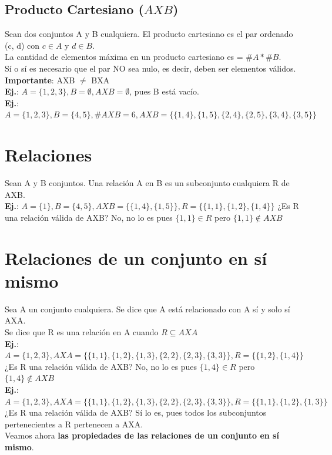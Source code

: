 \documentclass[10pt,a4paper]{article}
\begin{document}
\subsection*{Producto Cartesiano ($A X B$)}
Sean dos conjuntos A y B cualquiera. El producto cartesiano es el par ordenado (c, d) con $c \in A$ y $d \in B$. \\ 
La cantidad de elementos máxima en un producto cartesiano es = $\#A \ast \#B$. \\
Sí o sí es necesario que el par NO sea nulo, es decir, deben ser elementos válidos. \\
\textbf{Importante}: AXB $\neq$ BXA \\
\textbf{Ej.}: $A = \{1, 2, 3\}, B = \emptyset, AXB = \emptyset$, pues B está vacío. \\
\textbf{Ej.}: $A = \{1, 2, 3\}, B = \{4, 5\}, \#AXB = 6, AXB = \{\{1, 4\}, \{1, 5\}, \{2, 4\}, \{2, 5\}, \{3, 4\}, \{3, 5\} \}$
\section*{Relaciones}
Sean A y B conjuntos. Una relación A en B es un subconjunto cualquiera R de AXB. \\
\textbf{Ej.}: $A = \{1\}, B = \{4, 5\}, AXB=\{\{1, 4\}, \{1, 5\}\}, R = \{\{1, 1\}, \{1, 2\}, \{1, 4\}\}$ ¿Es R una relación válida de AXB? No, no lo es pues $\{1, 1\} \in R$ pero $ \{1, 1\} \notin AXB$
\section*{Relaciones de un conjunto en sí mismo}
Sea A un conjunto cualquiera. Se dice que A está relacionado con A sí y solo sí AXA. \\
Se dice que R es una relación en A cuando $ R \subseteq AXA$ \\
\textbf{Ej.}: $A = \{1, 2, 3\}, AXA=\{\{1, 1\}, \{1, 2\}, \{1, 3\}, \{2, 2\}, \{2, 3\}, \{3, 3\}\}, R = \{\{1, 2\}, \{1, 4\}\}$ ¿Es R una relación válida de AXB? No, no lo es pues $\{1, 4\} \in R$ pero $ \{1, 4\} \notin AXB$ \\
\textbf{Ej.}: $A = \{1, 2, 3\}, AXA=\{\{1, 1\}, \{1, 2\}, \{1, 3\}, \{2, 2\}, \{2, 3\}, \{3, 3\}\}, R = \{\{1, 1\}, \{1, 2\}, \{1, 3\}\}$ ¿Es R una relación válida de AXB? Sí lo es, pues todos los subconjuntos pertenecientes a R pertenecen a AXA. \\
Veamos ahora \textbf{las propiedades de las relaciones de un conjunto en sí mismo}.
\end{document}
